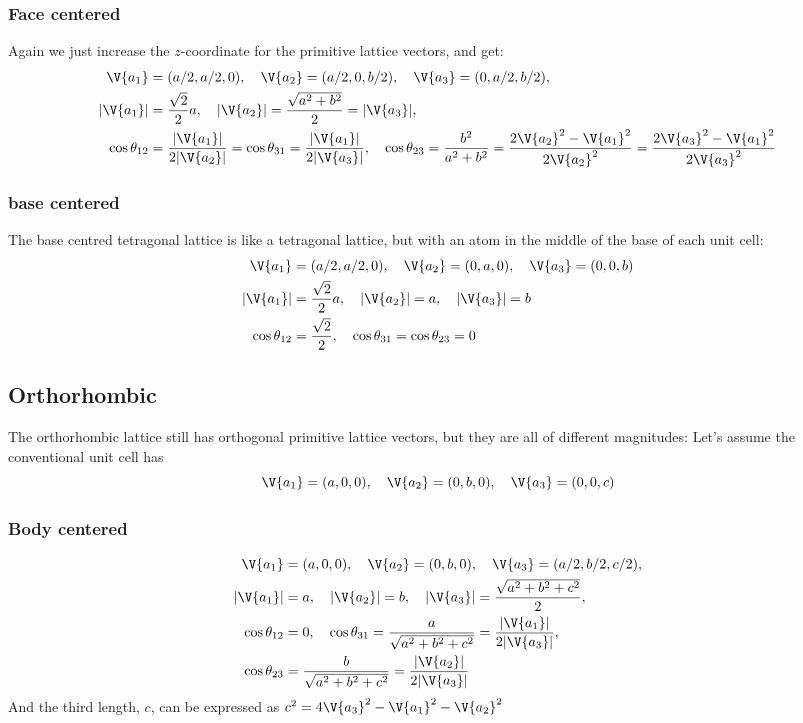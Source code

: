 \documentclass[main.tex]{subfiles}
\begin{document}
	\subsubsection*{Face centered}
	Again we just increase the $ z $-coordinate for the primitive lattice vectors, and get:
	\begin{align*}
		\V{a_1} &= (a/2,a/2,0), \quad \V{a_2} = (a/2,0,b/2), \quad \V{a_3} = (0,a/2,b/2),\\
		|\V{a_1}| &= \frac{\sqrt{2}}{2} a, \quad |\V{a_2}| = \frac{\sqrt{a^2+b^2}}{2} = |\V{a_3}|, \\
		\cos \theta_{12} & = \frac{|\V{a_1}|}{2|\V{a_2}|} = \cos \theta_{31} = \frac{|\V{a_1}|}{2 |\V{a_3}|}, \quad \cos \theta_{23} = \frac{b^2}{a^2+b^2} = \frac{2\V{a_2}^2 - \V{a_1}^2}{2\V{a_2}^2} = \frac{2\V{a_3}^2 - \V{a_1}^2}{2\V{a_3}^2}
	\end{align*}
	\subsubsection*{base centered}
	The base centred tetragonal lattice is like a tetragonal lattice, but with an atom in the middle of the base of each unit cell:
	\begin{align*}
		\V{a_1} &= (a/2,a/2,0), \quad \V{a_2} = (0,a,0), \quad \V{a_3} = (0,0,b) \\
		|\V{a_1}| &= \frac{\sqrt{2}}{2} a, \quad |\V{a_2}| = a, \quad |\V{a_3}| = b \\
		\cos \theta_{12} &= \frac{\sqrt{2}}{2}, \quad \cos \theta_{31} = \cos\theta_{23} = 0
	\end{align*}
	
	\subsection*{Orthorhombic}
	The orthorhombic lattice still has orthogonal primitive lattice vectors, but they are all of different magnitudes: Let's assume the conventional unit cell has 
	\begin{equation*}
		\V{a_1} = (a,0,0),\quad \V{a_2} = (0,b,0),\quad \V{a_3} = (0,0,c)
	\end{equation*}
	
	\subsubsection*{Body centered}
	\begin{align*}
		\V{a_1} &= (a, 0, 0), \quad \V{a_2} = (0,b,0), \quad \V{a_3} = (a/2, b/2, c/2), \\
		|\V{a_1}| &= a,\quad |\V{a_2}| = b, \quad |\V{a_3}| = \frac{\sqrt{a^2+b^2+c^2}}{2}, \\
		\cos \theta_{12} &= 0,\quad \cos \theta_{31} = \frac{a}{\sqrt{a^2+b^2+c^2}} = \frac{|\V{a_1}|}{2|\V{a_3}|}, \\
		\cos \theta_{23} &= \frac{b}{\sqrt{a^2+b^2+c^2}} = \frac{|\V{a_2}|}{2|\V{a_3}|}
	\end{align*}
	And the third length, $ c $, can be expressed as $ c^2 = 4\V{a_3}^2-\V{a_1}^2-\V{a_2}^2 $
	
\end{document}
